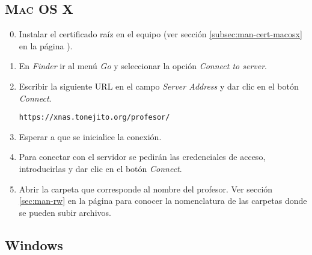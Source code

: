       \subsection {\textsc{Mac OS X}}
      \label{subsec:man-rw-macosx}

{
\linespread{0.1}
\begin{enumerate}
\setcounter{enumi}{-1} %

  \item Instalar el certificado ra\'{i}z en el equipo (ver secci\'{o}n \ref{subsec:man-cert-macosx} en la p\'{a}gina \pageref{subsec:man-cert-macosx}). 

  \item En \textsl{Finder} ir al men\'{u} \textsl{Go} y seleccionar la opci\'{o}n \textsl{Connect to server}.


  \item Escribir la siguiente \textsc{URL} en el campo \textsl{Server Address} y dar clic en el bot\'{o}n \textsl{Connect}.

    \texttt{https://xnas.tonejito.org/profesor/}


  \item Esperar a que se inicialice la conexi\'{o}n.


  \item Para conectar con el servidor se pedir\'{a}n las credenciales de acceso, introducirlas y dar clic en el bot\'{o}n \textsl{Connect}.


  \item Abrir la carpeta que corresponde al nombre del profesor. Ver secci\'{o}n \ref{sec:man-rw} en la p\'{a}gina \pageref{sec:man-rw} para conocer la nomenclatura de las carpetas donde se pueden subir archivos.


\end{enumerate}
}

      \label{man-rw-windows}
      \subsection {Windows}


